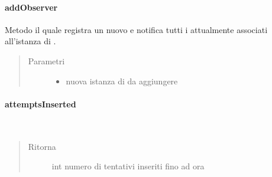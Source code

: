 \documentclass[letterpaper,10pt,italian,openany,oneside]{sphinxmanual}
\begin{document}
\paragraph{addObserver}
\label{\detokenize{source/it/unicam/cs/pa/mastermind/gamecore/BoardModel:addobserver}}

\begin{fulllineitems}
\label{\detokenize{source/it/unicam/cs/pa/mastermind/gamecore/BoardModel:it.unicam.cs.pa.mastermind.gamecore.BoardModel.addObserver(BoardObserver)}}
Metodo il quale registra un nuovo  e notifica tutti i  attualmente associati all’istanza di .
\begin{quote}\begin{description}
\item[{Parametri}] \leavevmode\begin{itemize}
\item {} 
 \textendash{} nuova istanza di  da aggiungere

\end{itemize}

\end{description}\end{quote}

\end{fulllineitems}



\paragraph{attemptsInserted}
\label{\detokenize{source/it/unicam/cs/pa/mastermind/gamecore/BoardModel:attemptsinserted}}

\begin{fulllineitems}
\label{\detokenize{source/it/unicam/cs/pa/mastermind/gamecore/BoardModel:it.unicam.cs.pa.mastermind.gamecore.BoardModel.attemptsInserted()}}~\begin{quote}\begin{description}
\item[{Ritorna}] \leavevmode
int numero di tentativi inseriti fino ad ora

\end{description}\end{quote}

\end{fulllineitems}
\end{document}

